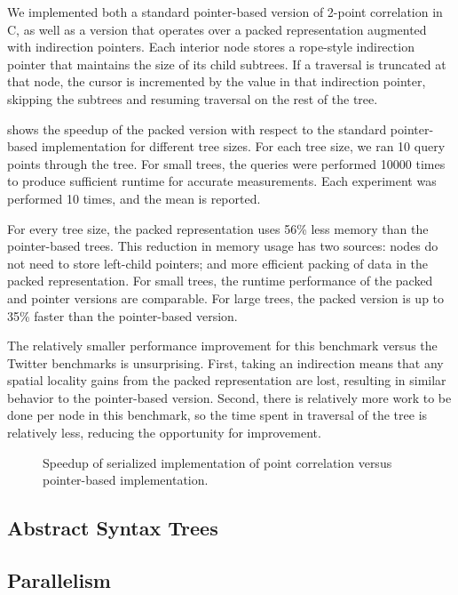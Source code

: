 We implemented both a standard pointer-based version of 2-point correlation in
C, as well as a version that operates over a packed representation augmented
with indirection pointers. Each interior node stores a rope-style
indirection pointer that maintains the size of its child subtrees. If a
traversal is truncated at that node, the cursor is incremented by the value in
that indirection pointer, skipping the subtrees and resuming traversal on the
rest of the tree.

 shows the speedup of the packed version
with respect to the standard pointer-based implementation for
different tree sizes. For each tree size, we ran 10 query points
through the tree. For small trees, the queries were performed 10000
times to produce sufficient runtime for accurate measurements. Each
experiment was performed 10 times, and the mean is reported.

For every tree size, the packed representation uses 56\% less memory
than the pointer-based trees. This reduction in memory usage has two
sources: nodes do not need to store left-child pointers; and more
efficient packing of data in the packed representation. For small
trees, the runtime performance of the packed and pointer versions are
comparable. For large trees, the packed version is up to 35\% faster
than the pointer-based version.

The relatively smaller performance improvement for this
benchmark versus the Twitter benchmarks is unsurprising. First, taking an
indirection means that any spatial locality gains from the packed
representation are lost, resulting in similar behavior to the
pointer-based version. Second, there is relatively more work to be
done per node in this benchmark, so the time spent in traversal of the
tree is relatively less, reducing the opportunity for improvement.


\begin{figure}
  \centering
  
  \caption{Speedup of serialized implementation of point correlation versus
    pointer-based implementation.}
  \label{fig:point_corr_plot}
\end{figure}

\subsection{Abstract Syntax Trees}


\subsection{Parallelism}

